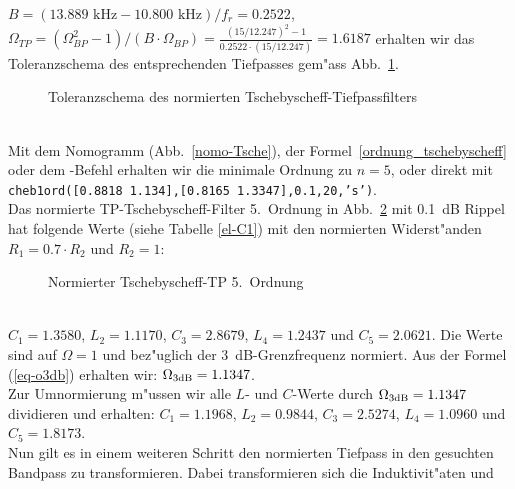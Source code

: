 $B=(13.889\mbox{~kHz}-10.800\mbox{~kHz})/f_r=0.2522$,
$\Omega_{TP}=(\Omega_{BP}^2-1)/(B\cdot\Omega_{BP})=\frac{ (15/12.247)^2-1}{0.2522\cdot (15/12.247)}=1.6187$ erhalten wir das Toleranzschema des
entsprechenden Tiefpasses gem"ass Abb.~\ref{tp-toleranz}.\\
\begin{figure}[!htb]
\vspace*{-4mm} 
\begin{center}
  \vspace*{-2mm}\caption{Toleranzschema des normierten Tschebyscheff-Tiefpassfilters\label{tp-toleranz}}
\end{center}
\vspace*{-6mm}
\end{figure}\\
\nit Mit dem Nomogramm (Abb.~\ref{nomo-Tsche}), der Formel~\ref{ordnung_tschebyscheff} oder dem \matlogo-Befehl  erhalten wir die minimale Ordnung zu $n=5$, oder direkt mit {\tt cheb1ord([0.8818 1.134],[0.8165 1.3347],0.1,20,'s')}.\\
Das normierte TP-Tschebyscheff-Filter 5.~Ordnung in Abb.~\ref{norm-c} mit 0.1~dB Rippel hat
folgende Werte (siehe Tabelle \ref{el-C1}) mit den normierten Widerst"anden $R_1=0.7\cdot R_2$ und $R_2=1$:\\
\vspace*{-9mm}
\begin{figure}[!htb]
\begin{center}
  \vspace*{-4mm}\caption{Normierter Tschebyscheff-TP 5.~Ordnung\label{norm-c}}
\end{center}
\vspace*{-6mm}
\end{figure}\\
$C_1=1.3580$, $L_2=1.1170$, $C_3=2.8679$, $L_4=1.2437$ und $C_5=2.0621$. Die
Werte sind auf $\Omega=1$ und bez"uglich der 3~dB-Grenzfrequenz
normiert. Aus der Formel (\ref{eq-o3db}) erhalten wir: $\Omega_{3{\rm dB}}=1.1347$.\\
Zur Umnormierung m"ussen wir alle $L$- und $C$-Werte durch $\Omega_{3{\rm dB}}=1.1347$
dividieren und erhalten: $C_1=1.1968$, $L_2=0.9844$, $C_3=2.5274$, $L_4=1.0960$ und $C_5=1.8173$.\\ Nun gilt es in einem
weiteren Schritt den normierten Tiefpass in den gesuchten Bandpass zu
transformieren. Dabei transformieren sich die Induktivit"aten und
